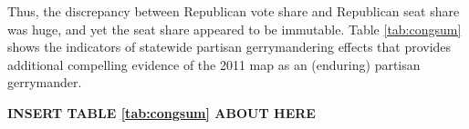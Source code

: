     Thus, the discrepancy between Republican vote share and Republican seat share was huge, and yet the seat share appeared to be immutable. Table \ref{tab:congsum} shows the indicators of statewide partisan gerrymandering effects that provides additional compelling evidence of the 2011 map as an (enduring) partisan gerrymander.   
\par
    
        \begin{center}\textbf{INSERT TABLE \ref{tab:congsum} ABOUT HERE} \end{center}
%
\par

